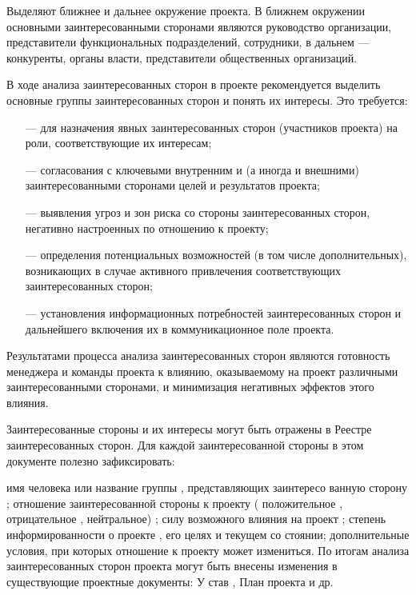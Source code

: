 Выделяют ближнее и дальнее окружение проекта.
В ближнем окружении основными заинтересованными сторонами являются руко­водство организации, представители функциональных подразделений,
сотрудники, в дальнем --- конкуренты, органы власти, представители общественных организаций.

В ходе анализа заинтересованных сторон в проекте рекомендуется выделить основные группы заинтересованных сторон и понять их ин­тересы.
Это требуется:
\begin{itemize}
	\item [---]для назначения явных заинтересованных сторон (участников про­екта) на роли, соответствующие их интересам;
	\item [---]согласования с ключевыми внутренним и (а иногда и внешними) заинтересованными сторонами целей и результатов проекта;
	\item [---]выявления угроз и зон риска со стороны заинтересованных сторон, негативно настроенных по отношению к проекту;
	\item [---]определения потенциальных возможностей (в том числе дополни­тельных), возникающих в случае активного привлечения соответ­ствующих заинтересованных сторон;
	\item [---]установления информационных потребностей заинтересованных сторон и дальнейшего включения их в коммуникационное поле проекта.
\end{itemize}

Результатами процесса анализа заинтересованных сторон являются готовность менеджера и команды проекта к влиянию, оказываемому на проект различными заинтересованными сторонами, и минимизация негативных эффектов этого влияния.

Заинтересованные стороны и их интересы могут быть отражены в Реестре заинтересованных сторон.
Для каждой заинтересованной стороны в этом документе полезно зафиксировать:

имя человека или название группы , представляющих заинтересо­
ванную сторону ;
отношение заинтересованной стороны к проекту ( положительное ,
отрицательное , нейтральное) ;
силу возможного влияния на проект ;
степень информированности о проекте , его целях и текущем со­
стоянии;
дополнительные условия, при которых отношение к проекту может
измениться.
По итогам анализа заинтересованных сторон проекта могут быть
внесены изменения в существующие проектные документы: У став ,
План проекта и др.



